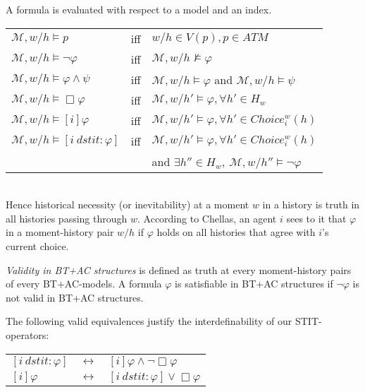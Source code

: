 \documentclass{article}
\renewcommand{\phi}{\varphi}
\newcommand{\eqv}{\leftrightarrow}      \newcommand{\imp}{\rightarrow}          \newcommand{\subfml}{\mathit{sf}}
\newcommand{\cstit}[1]{[{#1}]}           \newcommand{\poscstit}[1]{\langle {#1} \rangle}    \newcommand{\dstit}[2]{[{#1}\ \mathit{dstit}\! :{#2}]}
\newcommand{\atmset}{\ensuremath{\mathit{ATM}}}        \newcommand{\actset}{\ensuremath{\mathit{ACT}}}        \newcommand{\evtset}{\ensuremath{\mathit{EVT}}}
\newcommand{\STIT} {{\textsf{STIT}}}              \newcommand{\CSTIT}{{\textsf{CSTIT}}}            \newcommand{\DSTIT}{{\textsf{DSTIT}}}
\begin{document}
A formula is evaluated with respect to a model and an index.\\

\begin{tabular}{lcl}
$\mathcal{M},w/h \models p$ & iff  & $w/h \in V(p), p \in \atmset$\\
$\mathcal{M},w/h \models \lnot \phi$ & iff & $\mathcal{M},w/h \not\models \phi$\\
$\mathcal{M},w/h \models \phi \land \psi$ & iff & $\mathcal{M},w/h \models \phi$ and
                                                  $\mathcal{M},w/h \models \psi$\\
$\mathcal{M}, w/h \models \Box \phi     $ & iff & $\mathcal{M}, w/h' \models \phi,
                                                                   \forall h' \in H_w$\\
$\mathcal{M}, w/h \models \cstit{i} \phi $ & iff & $\mathcal{M}, w/h'\models \phi,
                                                        \forall h' \in Choice_i^w(h)$\\

$\mathcal{M}, w/h \models \dstit{i}{\phi}$ & iff & $\mathcal{M}, w/h' \models \phi,
                                                         \forall h' \in Choice_i^w(h)$\\
                      && and $\exists h'' \in H_w,\ \mathcal{M}, w/h'' \models \lnot\phi$
\end{tabular}\\

Hence historical necessity (or inevitability) at a moment $w$ in a history is
truth in all histories passing through $w$.
According to Chellas, an agent $i$ sees to it that $\phi$ in a moment-history pair $w/h$
if $\phi $ holds on all histories that agree with $i$'s current choice.

\emph{Validity in BT+AC structures}
is defined as truth at every moment-history pairs of every BT+AC-models.
A formula $\phi$ is satisfiable in BT+AC structures if $\lnot \phi$ is not valid
in BT+AC structures.

The following valid equivalences justify the interdefinability of
our \STIT-operators:
\begin{center}
\begin{tabular}{lcl}
$\dstit{i}{\phi}$ & $\eqv$ & $\cstit{i} \phi \land \lnot\Box\phi $ \\
$\cstit{i} \phi $ & $\eqv$ & $\dstit{i}{\phi} \lor \Box\phi      $
\end{tabular}
\end{center}
\end{document}
